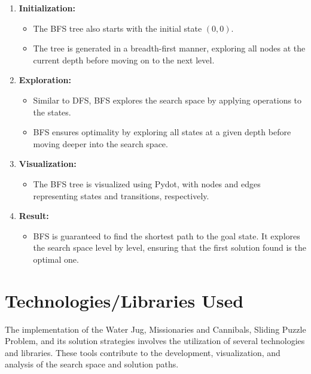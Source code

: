 \documentclass[12pt]{article}
\begin{document}
\begin{enumerate}
    \item \textbf{Initialization:}
        \begin{itemize}
            \item The BFS tree also starts with the initial state \((0,0)\).
            \item The tree is generated in a breadth-first manner, exploring all nodes at the current depth before moving on to the next level.
        \end{itemize}
    
    \item \textbf{Exploration:}
        \begin{itemize}
            \item Similar to DFS, BFS explores the search space by applying operations to the states.
            \item BFS ensures optimality by exploring all states at a given depth before moving deeper into the search space.
        \end{itemize}
    
    \item \textbf{Visualization:}
        \begin{itemize}
            \item The BFS tree is visualized using Pydot, with nodes and edges representing states and transitions, respectively.
        \end{itemize}
    
    \item \textbf{Result:}
        \begin{itemize}
            \item BFS is guaranteed to find the shortest path to the goal state. It explores the search space level by level, ensuring that the first solution found is the optimal one.
        \end{itemize}
\end{enumerate}


\section{Technologies/Libraries Used}


The implementation of the Water Jug, Missionaries and Cannibals, Sliding Puzzle Problem, and its solution strategies involves the utilization of several technologies and libraries. These tools contribute to the development, visualization, and analysis of the search space and solution paths.
\end{document}
